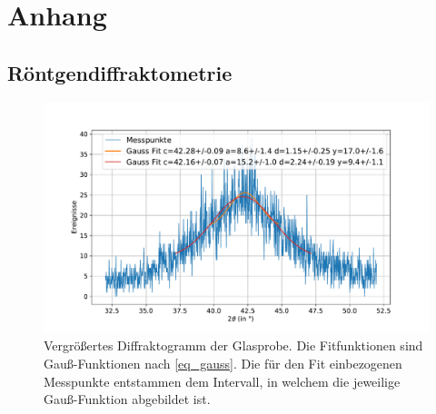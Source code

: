 \documentclass[
	a4paper,
	12pt,
	pagesize,
	ngerman
]{scrartcl}
\begin{document}
	\printbibliography
	\section{Anhang} \label{s_anhang}
	\subsection{Röntgendiffraktometrie}

	\begin{figure}[H]
			\includegraphics[width=\linewidth]{img/XRD_Glas_42_10.pdf}
			\caption{
				Vergrößertes Diffraktogramm der Glasprobe.
				Die Fitfunktionen sind Gauß-Funktionen nach \cref{eq_gauss}.
				Die für den Fit einbezogenen Messpunkte entstammen dem Intervall, in welchem die jeweilige Gauß-Funktion abgebildet ist.
				}
			\label{fig_xrd_glas_1}
	\end{figure}
\end{document}
